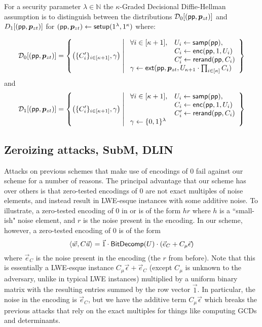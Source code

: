 \begin{definition}
\label{kgddh}
For a security parameter $\lambda \in \mathbb{N}$ the $\kappa$-Graded Decisional Diffie-Hellman assumption is to distinguish between the distributions $\mathcal{D}_0[(\mathsf{pp}, \bm{p}_{zt})]$ and $D_1[(\mathsf{pp}, \bm{p}_{zt})]$ for $(\mathsf{pp}, \bm{p}_{zt}) \leftarrow \mathsf{setup}(1^\lambda, 1^\kappa)$ where: 

$$\mathcal{D}_0[(\mathsf{pp}, \pzt)] = \left\{ \left(\{C_i'\}_{i\in [\kappa + 1]}, \gamma \right) \;\middle|\; \begin{array}{ll}
\forall i \in [\kappa + 1], &  U_i \leftarrow \mathsf{samp}(\mathsf{pp}),\\
& C_i \leftarrow \mathsf{enc}(\mathsf{pp}, 1, U_i)\\
& C_i' \leftarrow \mathsf{rerand}(\mathsf{pp}, C_i)\\
\multicolumn{2}{l}{\gamma \leftarrow \mathsf{ext}(\mathsf{pp}, \pzt, U_{\kappa+1} \cdot\prod_{i \in [\kappa]} C_i)}
\end{array}\right\}$$
and
$$\mathcal{D}_1[(\mathsf{pp}, \pzt)] = \left\{ \left(\{C_i'\}_{i\in [\kappa + 1]}, \gamma \right) \;\middle|\; \begin{array}{ll}
\forall i \in [\kappa + 1], &  U_i \leftarrow \mathsf{samp}(\mathsf{pp}),\\
& C_i \leftarrow \mathsf{enc}(\mathsf{pp}, 1, U_i)\\
& C_i' \leftarrow \mathsf{rerand}(\mathsf{pp}, C_i)\\
\multicolumn{2}{l}{\gamma \leftarrow \{0,1\}^\lambda}
\end{array}\right\}$$
\end{definition}



\subsection{Zeroizing attacks, SubM, DLIN}
Attacks on previous schemes \cite{chl,cgh,hj} that make use of encodings of 0 fail against our scheme for a number of reasons. The principal advantage that our scheme has over others is that zero-tested encodings of $0$ are not exact multiples of noise elements, and instead result in LWE-esque instances with some additive noise.  To illustrate, a zero-tested encoding of $0$ in \cite{clt} or \cite{ggh13a} is of the form $hr$ where $h$ is a ``small-ish" noise element, and $r$ is the noise present in the encoding.  In our scheme, however, a zero-tested encoding of $0$ is of the form
$$\left<\vec{w}, C \vec{u}\right> = \vec{1}\cdot \mathsf{BitDecomp}(U)\cdot (\vec{e}_C + C_\mu\vec{\epsilon})$$
where $\vec{e}_C$ is the noise present in the encoding (the $r$ from before).  Note that this is essentially a LWE-esque instance $C_\mu\vec{\epsilon} + \vec{e}_C$ (except $C_\mu$ is unknown to the adversary, unlike in typical LWE instances) multiplied by a uniform binary matrix with the resulting entries summed by the row vector $\vec{1}$.  In particular, the noise in the encoding is $\vec{e}_C$, but we have the additive term $C_\mu\vec{\epsilon}$ which breaks the previous attacks that rely on the exact multiples for things like computing GCDs and determinants. 

